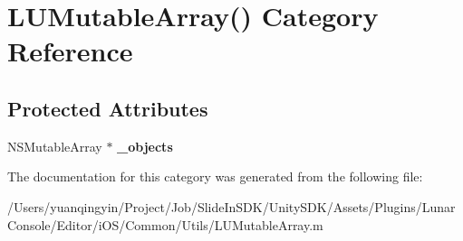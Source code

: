 \hypertarget{category_l_u_mutable_array_07_08}{}\section{L\+U\+Mutable\+Array() Category Reference}
\label{category_l_u_mutable_array_07_08}
\subsection*{Protected Attributes}
\begin{DoxyCompactItemize}
\item 
\mbox{\label{category_l_u_mutable_array_07_08_a9af3f3ebe52935731fc5ef1c0c9c8a8a}} 
N\+S\+Mutable\+Array $\ast$ {\bfseries \+\_\+objects}
\end{DoxyCompactItemize}


The documentation for this category was generated from the following file\+:\begin{DoxyCompactItemize}
\item 
/\+Users/yuanqingyin/\+Project/\+Job/\+Slide\+In\+S\+D\+K/\+Unity\+S\+D\+K/\+Assets/\+Plugins/\+Lunar\+Console/\+Editor/i\+O\+S/\+Common/\+Utils/L\+U\+Mutable\+Array.\+m\end{DoxyCompactItemize}
